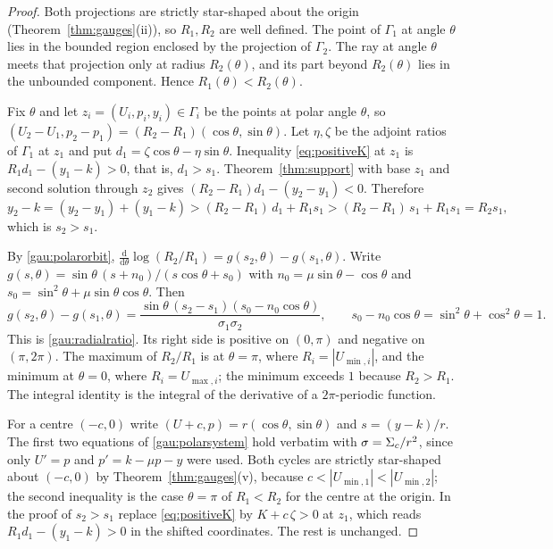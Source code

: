 \begin{proof}
Both projections are strictly star-shaped about the origin (Theorem~\ref{thm:gauges}(ii)), so $R_1,R_2$ are well defined. The point of $\Gamma_1$ at angle $\theta$ lies in the bounded region enclosed by the projection of $\Gamma_2$. The ray at angle $\theta$ meets that projection only at radius $R_2(\theta)$, and its part beyond $R_2(\theta)$ lies in the unbounded component. Hence $R_1(\theta)<R_2(\theta)$.

Fix $\theta$ and let $z_i=(U_i,p_i,y_i)\in\Gamma_i$ be the points at polar angle $\theta$, so $(U_2-U_1,p_2-p_1)=(R_2-R_1)(\cos\theta,\sin\theta)$. Let $\eta,\zeta$ be the adjoint ratios of $\Gamma_1$ at $z_1$ and put $d_1=\zeta\cos\theta-\eta\sin\theta$. Inequality \eqref{eq:positiveK} at $z_1$ is $R_1d_1-(y_1-k)>0$, that is, $d_1>s_1$. Theorem~\ref{thm:support} with base $z_1$ and second solution through $z_2$ gives $(R_2-R_1)d_1-(y_2-y_1)<0$. Therefore
\[
y_2-k=(y_2-y_1)+(y_1-k)>(R_2-R_1)\,d_1+R_1s_1>(R_2-R_1)\,s_1+R_1s_1=R_2s_1 ,
\]
which is $s_2>s_1$.

By \eqref{gau:polarorbit}, $\frac{\mathrm d}{\mathrm d\theta}\log(R_2/R_1)=g(s_2,\theta)-g(s_1,\theta)$. Write $g(s,\theta)=\sin\theta\,(s+n_0)/(s\cos\theta+s_0)$ with $n_0=\mu\sin\theta-\cos\theta$ and $s_0=\sin^2\theta+\mu\sin\theta\cos\theta$. Then
\[
g(s_2,\theta)-g(s_1,\theta)=\frac{\sin\theta\,(s_2-s_1)(s_0-n_0\cos\theta)}{\sigma_1\sigma_2},\qquad s_0-n_0\cos\theta=\sin^2\theta+\cos^2\theta=1 .
\]
This is \eqref{gau:radialratio}. Its right side is positive on $(0,\pi)$ and negative on $(\pi,2\pi)$. The maximum of $R_2/R_1$ is at $\theta=\pi$, where $R_i=|U_{\min,i}|$, and the minimum at $\theta=0$, where $R_i=U_{\max,i}$; the minimum exceeds $1$ because $R_2>R_1$. The integral identity is the integral of the derivative of a $2\pi$-periodic function.

For a centre $(-c,0)$ write $(U+c,p)=r(\cos\theta,\sin\theta)$ and $s=(y-k)/r$. The first two equations of \eqref{gau:polarsystem} hold verbatim with $\sigma=\Sigma_c/r^2$, since only $U'=p$ and $p'=k-\mu p-y$ were used. Both cycles are strictly star-shaped about $(-c,0)$ by Theorem~\ref{thm:gauges}(v), because $c<|U_{\min,1}|<|U_{\min,2}|$; the second inequality is the case $\theta=\pi$ of $R_1<R_2$ for the centre at the origin. In the proof of $s_2>s_1$ replace \eqref{eq:positiveK} by $K+c\,\zeta>0$ at $z_1$, which reads $R_1d_1-(y_1-k)>0$ in the shifted coordinates. The rest is unchanged.
\end{proof}
